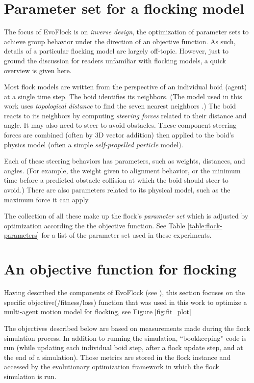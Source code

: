 \documentclass[letterpaper]{article}
\begin{document}
\section{Parameter set for a flocking model}
\label{sec:parameter_set}

The focus of EvoFlock is on \textit{inverse design}, the optimization of parameter sets to achieve group behavior under the direction of an objective function. As such, details of a particular flocking model are largely off-topic. However, just to ground the discussion for readers unfamiliar with flocking models, a quick overview is given here.

Most flock models are written from the perspective of an individual boid (agent) at a single time step. The boid identifies its neighbors. (The model used in this work uses \textit{topological distance} to find the seven nearest neighbors \citep{cavagna_seventh_2008}.) The boid reacts to its neighbors by computing \textit{steering forces} related to their distance and angle. It may also need to steer to avoid obstacles. These component steering forces are combined (often by 3D vector addition) then applied to the boid's physics model (often a simple \textit{self-propelled particle} model).

Each of these steering behaviors has parameters, such as weights, distances, and angles. (For example, the weight given to alignment behavior, or the minimum time before a predicted obstacle collision at which the boid should steer to avoid.) There are also parameters related to its physical model, such as the maximum force it can apply.

The collection of all these make up the flock's \textit{parameter set} which is adjusted by optimization according the the objective function. See Table \ref{table:flock-parameters} for a list of the parameter set used in these experiments.

\section{An objective function for flocking}
\label{sec:FlockingObjective}

Having described the components of EvoFlock (see ), this section focuses on the specific objective(/fitness/loss) function that was used in this work to optimize a multi-agent motion model for flocking, see Figure \ref{fig:fit_plot}

The objectives described below are based on measurements made during the flock simulation process. In addition to running the simulation, ``bookkeeping'' code is run (while updating each individual boid step, after a flock update step, and at the end of a simulation). Those metrics are stored in the flock instance and accessed by the evolutionary optimization framework in which the flock simulation is run.
\end{document}
